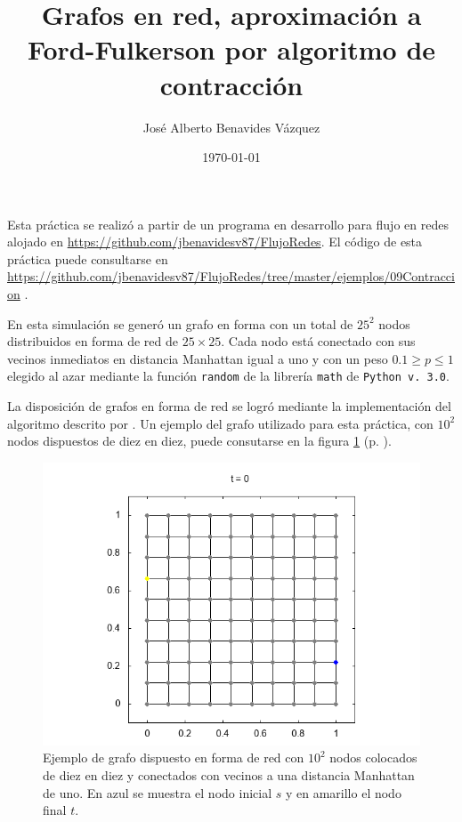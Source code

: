 \documentclass{article}
\title{Grafos en red, aproximación a Ford-Fulkerson por algoritmo de contracción}
\author{José Alberto Benavides Vázquez}
\date{\today}
\begin{document}
  \maketitle

  Esta práctica se realizó a partir de un programa en desarrollo para flujo en redes alojado en \url{https://github.com/jbenavidesv87/FlujoRedes}. El código de esta práctica puede consultarse en \url{https://github.com/jbenavidesv87/FlujoRedes/tree/master/ejemplos/09Contraccion} \citep{Grafos}.

  En esta simulación se generó un grafo en forma con un total de $25^2$ nodos distribuidos en forma de red de $25 \times 25$. Cada nodo está conectado con sus vecinos inmediatos en distancia Manhattan igual a uno y con un peso $0.1 \geq p \leq 1$ elegido al azar mediante la función \texttt{random} de la librería \texttt{math} de \texttt{Python v. 3.0}.

  La disposición de grafos en forma de red se logró mediante la implementación del algoritmo descrito por \citep{manhattan}. Un ejemplo del grafo utilizado para esta práctica, con $10^2$ nodos dispuestos de diez en diez, puede consutarse en la figura \ref{t000} (p. \pageref{t000}).

  \begin{figure}[h]
    \includegraphics[width=1\textwidth]{t000}
    \centering
    \caption{Ejemplo de grafo dispuesto en forma de red con $10^2$ nodos colocados de diez en diez y conectados con vecinos a una distancia Manhattan de uno. En azul se muestra el nodo inicial $s$ y en amarillo el nodo final $t$.}
    \label{t000}
  \end{figure}
\end{document}
